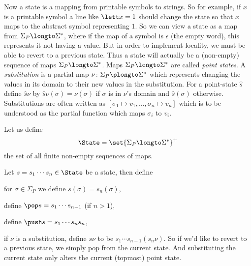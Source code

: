 Now a state is a mapping from printable symbols to strings.
So for example, if $x$ is a printable symbol a line like $\lett x=1$ should change the state so that $x$ maps to the abstract symbol representing $1$.
So we can view a state as a map from $\Sigma_P\longto\Sigma^*$, where if the map of a symbol is $\epsilon$ (the empty word), this represents it not having a value.
But in order to implement locality, we must be able to revert to a previous state.
Thus a state will actually be a (non-empty) sequence of maps $\Sigma_P\longto\Sigma^*$.
Maps $\Sigma_P\longto\Sigma^*$ are called {\it point states}.
A {\it substitution} is a partial map $\nu\colon\Sigma_P\plongto\Sigma^*$ which represents changing the values in its domain to their new values in the substitution.
For a point-state $\hat s$ define $\hat s\nu$ by $\hat s\nu(\sigma)=\nu(\sigma)$ if $\sigma$ is in $\nu$'s domain and $\hat s(\sigma)$ otherwise.
Substitutions are often written as $[\sigma_1\mapsto v_1,\dots,\sigma_n\mapsto v_n]$ which is to be understood as the partial function which maps $\sigma_i$ to $v_i$.

Let us define
$$ \State = \set{\Sigma_P\longto\Sigma^*}^+ $$
the set of all finite non-empty sequences of maps.

Let $ s= s_1\cdots s_n\in\State$ be a state, then define
\blist
    \item for $\sigma\in\Sigma_P$ we define $ s(\sigma)= s_n(\sigma)$,
    \item define $\pop s= s_1\cdots s_{n-1}$ (if $n>1$),
    \item define $\push s= s_1\cdots s_n s_n$,
    \item if $\nu$ is a substitution, define $s\nu$ to be $s_1\cdots s_{n-1}(s_n\nu)$.
\elist
\noindent So if we'd like to revert to a previous state, we simply pop from the current state.
And substituting the current state only alters the current (topmost) point state.

